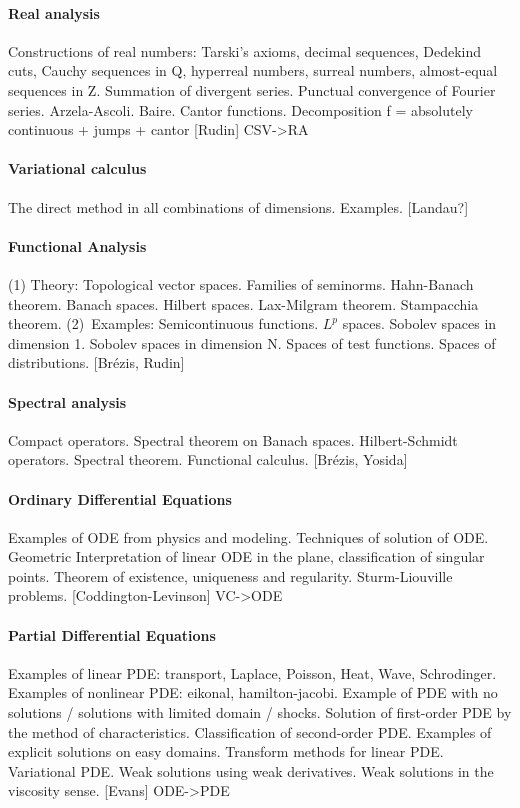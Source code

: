 \paragraph{Real analysis}
Constructions of real numbers: Tarski's axioms, decimal sequences, Dedekind
cuts, Cauchy sequences in Q, hyperreal numbers, surreal numbers, almost-equal
sequences in Z.
Summation of divergent series.
Punctual convergence of Fourier series.
Arzela-Ascoli.  Baire.  Cantor functions.
Decomposition f = absolutely continuous + jumps + cantor
[Rudin]
{CSV->RA}

\paragraph{Variational calculus}
The direct method in all combinations of dimensions.
Examples. [Landau?]



\paragraph{Functional Analysis}
(1) Theory:
Topological vector spaces.  Families of seminorms.  Hahn-Banach theorem.
Banach spaces.
Hilbert spaces.  Lax-Milgram theorem.  Stampacchia theorem.
(2)~Examples:
Semicontinuous functions.
$L^p$ spaces.
Sobolev spaces in dimension 1.
Sobolev spaces in dimension N.
Spaces of test functions.
Spaces of distributions.
[Brézis, Rudin]

\paragraph{Spectral analysis}
Compact operators.
Spectral theorem on Banach spaces.
Hilbert-Schmidt operators.
Spectral theorem.  Functional calculus.
[Brézis, Yosida]

\paragraph{Ordinary Differential Equations}
Examples of ODE from physics and modeling.
Techniques of solution of ODE.
Geometric Interpretation of linear ODE in the plane, classification of
singular points.
Theorem of existence, uniqueness and regularity.
Sturm-Liouville problems.
[Coddington-Levinson]
{VC->ODE}

\paragraph{Partial Differential Equations}
Examples of linear PDE: transport, Laplace, Poisson, Heat, Wave, Schrodinger.
Examples of nonlinear PDE: eikonal, hamilton-jacobi.
Example of PDE with no solutions / solutions with limited domain / shocks.
Solution of first-order PDE by the method of characteristics.
Classification of second-order PDE.  Examples of explicit solutions on easy
domains.
Transform methods for linear PDE.
Variational PDE.
Weak solutions using weak derivatives.
Weak solutions in the viscosity sense.
[Evans]
{ODE->PDE}

